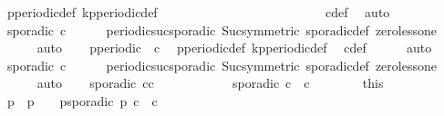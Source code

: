 \begin{isabellebody}
\ p{\isacharunderscore}periodic{\isacharunderscore}def\ kp{\isacharunderscore}periodic{\isacharunderscore}def\isanewline
\ \ \ \ \ \ \ \ \ \ \ \ \ \ \ \ \ \ \ \ \ \ \ \ \isamarkupfalse%
\ c{\isacharunderscore}def\ \isamarkupfalse%
\ auto\isanewline
\ \ \isamarkupfalse%
\ {}{\isacharcolon}{\isacartoucheopen}sporadic\ c{\isacartoucheclose}\isanewline
\ \ \ \ \isamarkupfalse%
\ periodic{\isacharunderscore}suc{\isacharunderscore}sporadic\ Suc{\isacharunderscore}{}{\isacharbrackleft}symmetric{\isacharbrackright}\ sporadic{\isacharunderscore}def\ zero{\isacharunderscore}less{\isacharunderscore}one\isanewline
\ \ \ \ \isamarkupfalse%
\ auto\isanewline
\isanewline
\ \ \isamarkupfalse%
\ {\isacartoucheopen}p{\isacharunderscore}periodic\ {}\ c{\isacharprime}{\isacartoucheclose}\ \isamarkupfalse%
\ p{\isacharunderscore}periodic{\isacharunderscore}def\ kp{\isacharunderscore}periodic{\isacharunderscore}def\ \isamarkupfalse%
\ c{\isacharprime}{\isacharunderscore}def\isanewline
\ \ \ \ \isamarkupfalse%
\ auto\isanewline
\ \ \isamarkupfalse%
\ {}{\isacharcolon}{\isacartoucheopen}sporadic\ c{\isacharprime}{\isacartoucheclose}\isanewline
\ \ \ \ \isamarkupfalse%
\ periodic{\isacharunderscore}suc{\isacharunderscore}sporadic\ Suc{\isacharunderscore}{}{\isacharbrackleft}symmetric{\isacharbrackright}\ sporadic{\isacharunderscore}def\ zero{\isacharunderscore}less{\isacharunderscore}one\isanewline
\ \ \ \ \isamarkupfalse%
\ auto\isanewline
\isanewline
\ \ \isamarkupfalse%
\ {\isacartoucheopen}{\isasymnot}sporadic\ {\isacharparenleft}c{\isasymoplus}c{\isacharprime}{\isacharparenright}{\isacartoucheclose}\isanewline
\ \ \isamarkupfalse%
\ {\isacharminus}\isanewline
\ \ \ \ \isacommand{{\isacharbraceleft}}\isamarkupfalse%
\ \isamarkupfalse%
\ {\isacartoucheopen}sporadic\ {\isacharparenleft}c\ {\isasymoplus}\ c{\isacharprime}{\isacharparenright}{\isacartoucheclose}\isanewline
\ \ \ \ \ \ \isamarkupfalse%
\ this\ \isamarkupfalse%
\ p\ \ {\isacharasterisk}{\isacharcolon}{\isacartoucheopen}p\ {\isachargreater}\ {}{\isacartoucheclose}\ \ {\isacartoucheopen}p{\isacharunderscore}sporadic\ p\ {\isacharparenleft}c\ {\isasymoplus}\ c{\isacharprime}{\isacharparenright}{\isacartoucheclose}\isanewline

\end{isabellebody}
